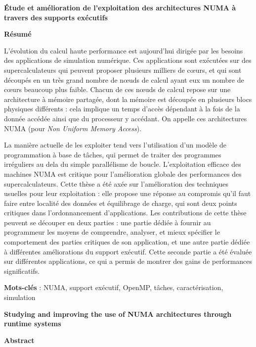 \MakeUGthesePDG

\clearpage
\hbox{}\newpage

\begin{center}\textbf{\large Étude et amélioration de l'exploitation des architectures NUMA à travers des supports exécutifs}

\quad

\textbf{Résumé}
\end{center}

L'évolution du calcul haute performance est aujourd'hui dirigée par les besoins des applications de simulation numérique.
Ces applications sont exécutées sur des supercalculateurs qui peuvent proposer plusieurs milliers de cœurs, et qui sont découpés en un très grand nombre de nœuds de calcul ayant eux un nombre de cœurs beaucoup plus faible.
Chacun de ces nœuds de calcul repose sur une architecture à mémoire partagée, dont la mémoire est découpée en plusieurs blocs physiques différents : cela implique un temps d'accès dépendant à la fois de la donnée accédée ainsi que du processeur y accédant.
On appelle ces architectures NUMA (pour \emph{Non Uniform Memory Access}).

La manière actuelle de les exploiter tend vers l'utilisation d'un modèle de programmation à base de tâches, qui permet de traiter des programmes irréguliers au dela du simple parallélisme de boucle.
L'exploitation efficace des machines NUMA est critique pour l'amélioration globale des performances des supercalculateurs.
Cette thèse a été axée sur l'amélioration des techniques usuelles pour leur exploitation : elle propose une réponse au compromis qu'il faut faire entre localité des données et équilibrage de charge, qui sont deux points critiques dans l'ordonnancement d'applications.
Les contributions de cette thèse peuvent se découper en deux parties : une partie dédiée à fournir au programmeur les moyens de comprendre, analyser, et mieux spécifier le comportement des parties critiques de son application, et une autre partie dédiée à différentes améliorations du support exécutif.
Cette seconde partie a été évaluée sur différentes applications, ce qui a permis de montrer des gains de performances significatifs.



\quad

\textbf{Mots-clés} : NUMA, support exécutif, OpenMP, tâches, caractérisation, simulation

\vfill
\pagebreak

\begin{center}\textbf{\large Studying and improving the use of NUMA architectures through runtime systems }

\quad

\textbf{Abstract}
\end{center}


